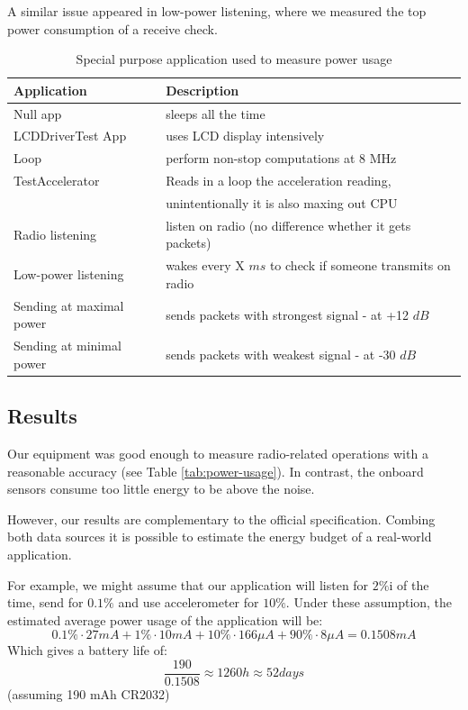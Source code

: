 A similar issue appeared in low-power listening, where we measured the top power consumption of a receive check.


\begin{table}
  \centering
    \begin{tabular}{|l|l|}
        \hline
    \textbf{Application} & \textbf{Description} \\ \hline
    Null app & sleeps all the time \\ \hline
    LCDDriverTest App & uses LCD display intensively \\ \hline
    Loop & perform non-stop computations at 8 MHz \\ \hline
    TestAccelerator & Reads in a loop the acceleration reading, \\
    & unintentionally it is also maxing out CPU \\ \hline
    Radio listening & listen on radio (no difference whether it gets packets) \\ \hline
    Low-power listening & wakes every X $ ms $ to check if someone transmits on radio \\ \hline
    Sending at maximal power & sends packets with strongest signal - at +12 $ dB $ \\ \hline
    Sending at minimal power & sends packets with weakest signal - at -30 $ dB $ \\ \hline
    \end{tabular}
  \caption{Special purpose application used to measure power usage}
  \label{tab:power-apps}
\end{table}

\subsection{Results}

Our equipment was good enough to measure radio-related operations with a reasonable accuracy (see Table \ref{tab:power-usage}).
In contrast, the onboard sensors consume too little energy to be above the noise.

However, our results are complementary to the official specification.
Combing both data sources it is possible to estimate the energy budget of a real-world application.

For example, we might assume that our application will listen for $2 \%$i of the time, send for $ 0.1 \% $ and use accelerometer for $ 10 \% $.
Under these assumption, the estimated average power usage of the application will be:
\begin{equation}
0.1 \% \cdot 27 mA + 1 \% \cdot 10 mA + 10 \% \cdot 166 \mu A + 90 \% \cdot 8 \mu A = 0.1508 mA   
  \label{eqn:power_example}
\end{equation}
Which gives a battery life of:
$$
\frac{190}{0.1508} \approx 1260 h \approx 52 days
$$
(assuming 190 mAh CR2032)



